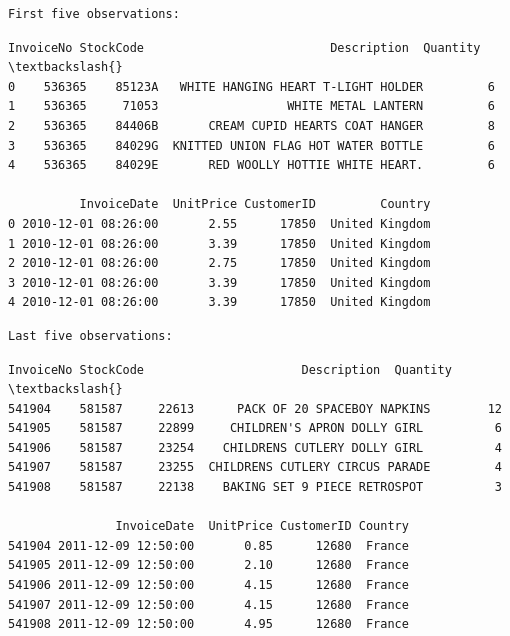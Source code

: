 \documentclass[11pt]{article}
\begin{document}
    \begin{Verbatim}[commandchars=\\\{\}]
First five observations:
    \end{Verbatim}

    
    \begin{Verbatim}[commandchars=\\\{\}]
  InvoiceNo StockCode                          Description  Quantity  \textbackslash{}
0    536365    85123A   WHITE HANGING HEART T-LIGHT HOLDER         6   
1    536365     71053                  WHITE METAL LANTERN         6   
2    536365    84406B       CREAM CUPID HEARTS COAT HANGER         8   
3    536365    84029G  KNITTED UNION FLAG HOT WATER BOTTLE         6   
4    536365    84029E       RED WOOLLY HOTTIE WHITE HEART.         6   

          InvoiceDate  UnitPrice CustomerID         Country  
0 2010-12-01 08:26:00       2.55      17850  United Kingdom  
1 2010-12-01 08:26:00       3.39      17850  United Kingdom  
2 2010-12-01 08:26:00       2.75      17850  United Kingdom  
3 2010-12-01 08:26:00       3.39      17850  United Kingdom  
4 2010-12-01 08:26:00       3.39      17850  United Kingdom  
    \end{Verbatim}

    
    \begin{Verbatim}[commandchars=\\\{\}]
Last five observations:
    \end{Verbatim}

    
    \begin{Verbatim}[commandchars=\\\{\}]
       InvoiceNo StockCode                      Description  Quantity  \textbackslash{}
541904    581587     22613      PACK OF 20 SPACEBOY NAPKINS        12   
541905    581587     22899     CHILDREN'S APRON DOLLY GIRL          6   
541906    581587     23254    CHILDRENS CUTLERY DOLLY GIRL          4   
541907    581587     23255  CHILDRENS CUTLERY CIRCUS PARADE         4   
541908    581587     22138    BAKING SET 9 PIECE RETROSPOT          3   

               InvoiceDate  UnitPrice CustomerID Country  
541904 2011-12-09 12:50:00       0.85      12680  France  
541905 2011-12-09 12:50:00       2.10      12680  France  
541906 2011-12-09 12:50:00       4.15      12680  France  
541907 2011-12-09 12:50:00       4.15      12680  France  
541908 2011-12-09 12:50:00       4.95      12680  France  
    \end{Verbatim}
\end{document}

